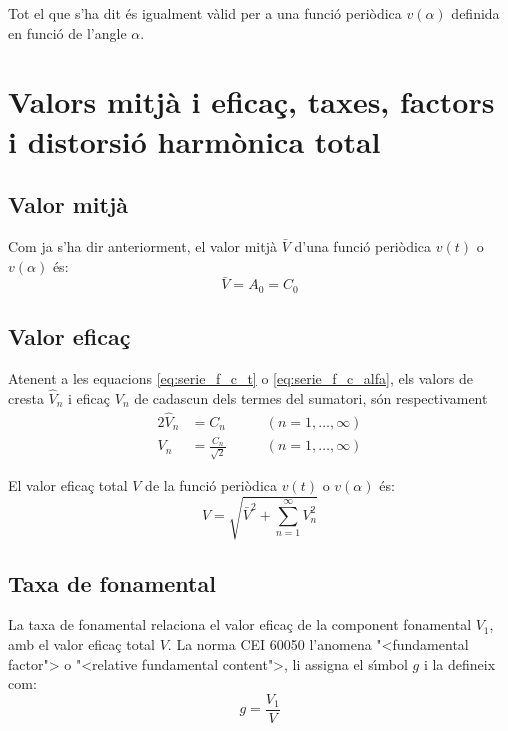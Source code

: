 Tot el que s'ha dit \'{e}s igualment v\`{a}lid per a una funci\'{o} peri\`{o}dica
$v(\alpha)$  definida en funci\'{o} de l'angle $\alpha$.


\section{Valors mitj\`{a} i efica\c{c}, taxes, factors i distorsi\'{o} harm\`{o}nica total}\label{sec:four_val_mitja_ef}

\subsection{Valor mitj\`{a}}\label{sec:four_val_av}

Com ja s'ha dir anteriorment, el valor mitj\`{a} $\bar{V}$ d'una
funci\'{o} peri\`{o}dica $v(t)$ o $v(\alpha)$ \'{e}s:
\begin{equation}
    \bar{V} = A_0 = C_0
\end{equation}

\subsection{Valor efica\c{c}}\label{sec:four_val_ef}

Atenent a les equacions  \eqref{eq:serie_f_c_t} o
\eqref{eq:serie_f_c_alfa}, els valors de cresta $\hat{V}_n$ i efica\c{c}
$V_n$ de cadascun dels termes del sumatori, s\'{o}n respectivament
\begin{alignat}{2}
    \hat{V}_n &= C_n &\qquad(n=1,\ldots,\infty)\\[0.5ex]
    V_n &= \frac{C_n}{\sqrt{2}} &\qquad(n=1,\ldots,\infty)
\end{alignat}

El valor efica\c{c} total $V$ de  la funci\'{o} peri\`{o}dica $v(t)$ o
$v(\alpha)$ \'{e}s:
\begin{equation}
    V = \sqrt{\bar{V}^2 + \sum_{n=1}^{\infty}V^2_n} \label{eq:val_ef_fourier}
\end{equation}

\subsection{Taxa de fonamental}
La taxa  de fonamental relaciona el valor efica\c{c} de la component fonamental $V_1$, amb el valor efica\c{c}
total $V$. La norma \textsf{CEI 60050} l'anomena {"<}fundamental factor{">} o {"<}relative fundamental content{">}, li assigna el s\'{\i}mbol $g$ i la defineix com:
\begin{equation}
    g = \frac{V_1}{V}
\end{equation}

